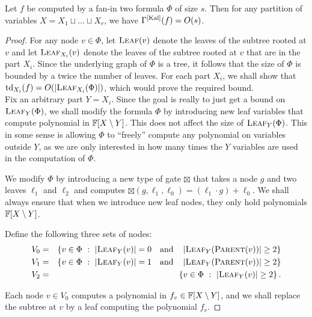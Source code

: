 \begin{lemma}\label{lem:kal-upperbound}
  Let $f$ be computed by a fan-in two formula $\Phi$ of size $s$.
Then for any partition of variables $X = X_1\sqcup \dots \sqcup X_r$, we have $\Gamma^{\mathrm{[Kal]}}(f) = O(s)$.
\end{lemma}
\begin{proof}
  For any node $v\in \Phi$, let $\textsc{Leaf}(v)$ denote the leaves of the subtree rooted at $v$ and let $\textsc{Leaf}_{X_i}(v)$ denote the leaves of the subtree rooted at $v$ that are in the part $X_i$.
Since the underlying graph of $\Phi$ is a tree, it follows that the size of $\Phi$ is bounded by a twice the number of leaves.
For each part $X_i$, we shall show that $\mathrm{td}_{X_i}(f) = O(\left|\textsc{Leaf}_{X_i}(\Phi)\right|)$, which would prove the required bound.
\\

Fix an arbitrary part $Y = X_i$.
Since the goal is really to just get a bound on $\textsc{Leaf}_{Y}(\Phi)$, we shall modify the formula $\Phi$ by introducing new leaf variables that compute polynomial in $\mathbb{F}[X \setminus Y]$.
This does not affect the size of $\textsc{Leaf}_{Y}(\Phi)$.
This in some sense is allowing $\Phi$ to ``freely'' compute any polynomial on variables outside $Y$, as we are only interested in how many times the $Y$ variables are used in the computation of $\Phi$.

We modify $\Phi$ by introducing a new type of gate $\boxtimes$ that takes a node $g$ and two leaves $\ell_1$ and $\ell_2$ and computes $\boxtimes(g,\ell_1,\ell_0) = (\ell_1 \cdot g) + \ell_0$.
We shall always ensure that when we introduce new leaf nodes, they only hold polynomials $\mathbb{F}[X \setminus Y]$.

Define the following three sets of nodes:
  \begin{eqnarray*}
    V_0 & = & \left\{{v\in \Phi}\ : \ {\left|\textsc{Leaf}_{Y}(v)\right| = 0 \quad\text{and}\quad \left|\textsc{Leaf}_{Y}(\textsc{Parent}(v))\right| \geq 2}\right\}\\
    V_1 & = & \left\{{v\in \Phi}\ : \ {\left|\textsc{Leaf}_{Y}(v)\right| = 1 \quad\text{and}\quad \left|\textsc{Leaf}_{Y}(\textsc{Parent}(v))\right| \geq 2}\right\}\\
    V_2 & = & \left\{{v\in \Phi}\ : \ {\left|\textsc{Leaf}_{Y}(v)\right| \geq 2}\right\}.
  \end{eqnarray*}


  Each node $v\in V_0$ computes a polynomial in $f_v \in \mathbb{F}[X\setminus Y]$, and we shall replace the subtree at $v$ by a leaf computing the polynomial $f_v$.


\end{proof}
